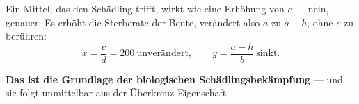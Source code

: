 \begin{aufgabe}
Ein Mittel, das  den Schädling trifft, wirkt wie eine Erhöhung von $c$ --- nein, genauer: Es erhöht die Sterberate der Beute, verändert also $a$ zu $a - h$, ohne $c$ zu berühren:
\[ \overline x = \frac{c}{d} = 200 \ \text{unverändert}, \qquad \overline y = \frac{a-h}{b} \ \text{sinkt} . \]

\begin{center}
\begin{minipage}{0.88\textwidth}
\end{minipage}
\end{center}

\begin{center}
\begin{minipage}{0.9\textwidth}
\textbf{Das ist die Grundlage der biologischen Schädlingsbekämpfung} --- und sie folgt unmittelbar aus der Überkreuz-Eigenschaft.
\end{minipage}
\end{center}
\end{aufgabe}

